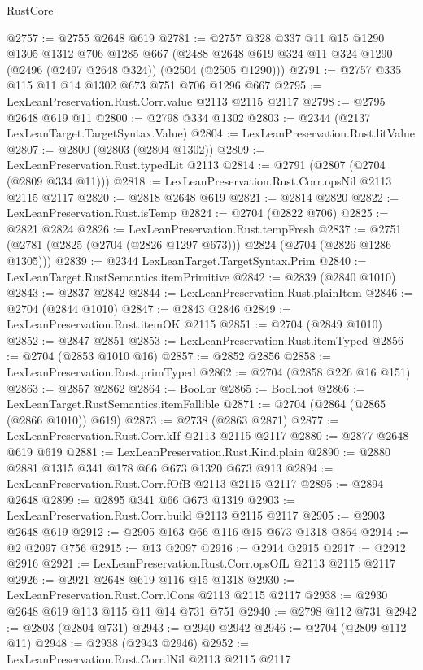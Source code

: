 \begin{lexlean}{RustCore}
\begin{coremodule}
@2757 := @2755 @2648 @619
@2781 := @2757
    @328
    @337
    @11
    @15
    @1290
    @1305
    @1312
    @706
    @1285
    @667
    (@2488 @2648 @619 @324 @11 @324 @1290 (@2496 (@2497 @2648 @324)) (@2504 (@2505 @1290)))
@2791 := @2757 @335 @115 @11 @14 @1302 @673 @751 @706 @1296 @667
@2795 := LexLeanPreservation.Rust.Corr.value @2113 @2115 @2117
@2798 := @2795 @2648 @619 @11
@2800 := @2798 @334 @1302
@2803 := @2344 (@2137 LexLeanTarget.TargetSyntax.Value)
@2804 := LexLeanPreservation.Rust.litValue
@2807 := @2800 (@2803 (@2804 @1302))
@2809 := LexLeanPreservation.Rust.typedLit @2113
@2814 := @2791 (@2807 (@2704 (@2809 @334 @11)))
@2818 := LexLeanPreservation.Rust.Corr.opsNil @2113 @2115 @2117
@2820 := @2818 @2648 @619
@2821 := @2814 @2820
@2822 := LexLeanPreservation.Rust.isTemp
@2824 := @2704 (@2822 @706)
@2825 := @2821 @2824
@2826 := LexLeanPreservation.Rust.tempFresh
@2837 := @2751 (@2781 (@2825 (@2704 (@2826 @1297 @673))) @2824 (@2704 (@2826 @1286 @1305)))
@2839 := @2344 LexLeanTarget.TargetSyntax.Prim
@2840 := LexLeanTarget.RustSemantics.itemPrimitive
@2842 := @2839 (@2840 @1010)
@2843 := @2837 @2842
@2844 := LexLeanPreservation.Rust.plainItem
@2846 := @2704 (@2844 @1010)
@2847 := @2843 @2846
@2849 := LexLeanPreservation.Rust.itemOK @2115
@2851 := @2704 (@2849 @1010)
@2852 := @2847 @2851
@2853 := LexLeanPreservation.Rust.itemTyped
@2856 := @2704 (@2853 @1010 @16)
@2857 := @2852 @2856
@2858 := LexLeanPreservation.Rust.primTyped
@2862 := @2704 (@2858 @226 @16 @151)
@2863 := @2857 @2862
@2864 := Bool.or
@2865 := Bool.not
@2866 := LexLeanTarget.RustSemantics.itemFallible
@2871 := @2704 (@2864 (@2865 (@2866 @1010)) @619)
@2873 := @2738 (@2863 @2871)
@2877 := LexLeanPreservation.Rust.Corr.kIf @2113 @2115 @2117
@2880 := @2877 @2648 @619 @619
@2881 := LexLeanPreservation.Rust.Kind.plain
@2890 := @2880 @2881 @1315 @341 @178 @66 @673 @1320 @673 @913
@2894 := LexLeanPreservation.Rust.Corr.fOfB @2113 @2115 @2117
@2895 := @2894 @2648
@2899 := @2895 @341 @66 @673 @1319
@2903 := LexLeanPreservation.Rust.Corr.build @2113 @2115 @2117
@2905 := @2903 @2648 @619
@2912 := @2905 @163 @66 @116 @15 @673 @1318 @864
@2914 := @2 @2097 @756
@2915 := @13 @2097
@2916 := @2914 @2915
@2917 := @2912 @2916
@2921 := LexLeanPreservation.Rust.Corr.opsOfL @2113 @2115 @2117
@2926 := @2921 @2648 @619 @116 @15 @1318
@2930 := LexLeanPreservation.Rust.Corr.lCons @2113 @2115 @2117
@2938 := @2930 @2648 @619 @113 @115 @11 @14 @731 @751
@2940 := @2798 @112 @731
@2942 := @2803 (@2804 @731)
@2943 := @2940 @2942
@2946 := @2704 (@2809 @112 @11)
@2948 := @2938 (@2943 @2946)
@2952 := LexLeanPreservation.Rust.Corr.lNil @2113 @2115 @2117

\end{coremodule}
\end{lexlean}
